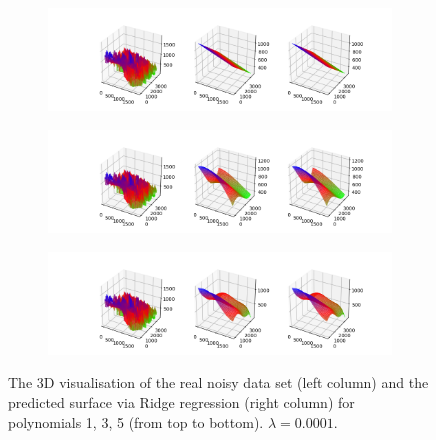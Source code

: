 \begin{figure}[!htbp]
\begin{subfigure}{\textwidth}
  \centering
  \includegraphics[width=1\linewidth]{images/surf/real_ridge_p01_nreal.png}
\end{subfigure}
\begin{subfigure}{\textwidth}
  \centering
  \includegraphics[width=1\linewidth]{images/surf/real_ridge_p03_nreal.png}
\end{subfigure}
\begin{subfigure}{\textwidth}
  \centering
  \includegraphics[width=1\linewidth]{images/surf/real_ridge_p05_nreal.png}
\end{subfigure}
\caption{The 3D visualisation of the real noisy data set (left column) and the predicted surface via Ridge regression (right column) for polynomials 1, 3, 5 (from top to bottom). $\lambda = 0.0001$.}
\label{fig:ridge-surf-real}
\end{figure}

